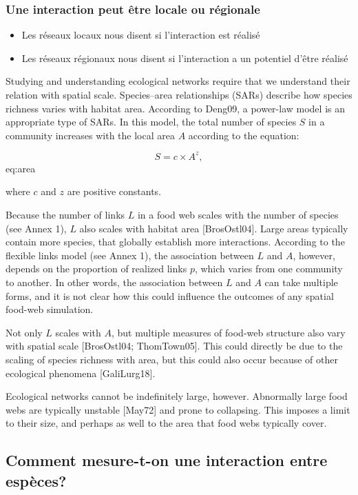 \subsubsection{Une interaction peut être locale ou régionale} 

\begin{itemize}
    \item Les réseaux locaux nous disent si l'interaction est réalisé 
    \item Les réseaux régionaux nous disent si l'interaction a un potentiel d'être réalisé
\end{itemize}

Studying and understanding
ecological networks require that we understand their relation with spatial
scale.  Species–area relationships (SARs) describe how species richness varies
with habitat area. According to Deng09, a power-law model is an appropriate
type of SARs. In this model, the total number of species $S$ in a community
increases with the local area $A$ according to the equation:

$$ S = c \times A^z, $$ {eq:area}



where $c$ and $z$ are positive constants.

Because the number of links $L$ in a food web scales with the number of species
(see Annex 1), $L$ also scales with habitat area [BrosOstl04]. Large areas
typically contain more species, that globally establish more interactions.
According to the flexible links model (see Annex 1), the association between $L$
and $A$, however, depends on the proportion of realized links $p$, which varies
from one community to another. In other words, the association between $L$ and
$A$ can take multiple forms, and it is not clear how this could influence the
outcomes of any spatial food-web simulation.

Not only $L$ scales with $A$, but multiple measures of food-web structure also
vary with spatial scale [BrosOstl04; ThomTown05]. This could directly be due
to the scaling of species richness with area, but this could also occur because
of other ecological phenomena [GaliLurg18].

Ecological networks cannot be indefinitely large, however. Abnormally large food
webs are typically unstable [May72] and prone to collapsing. This
imposes a limit to their size, and perhaps as well to the area that food webs
typically cover.

\subsection{Comment mesure-t-on une interaction entre espèces?} 

